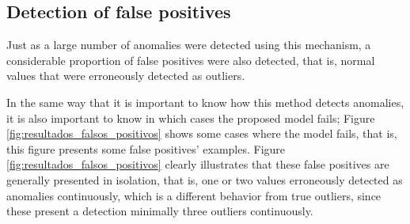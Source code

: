 \subsection{Detection of false positives}

Just as a large number of anomalies were detected using this mechanism, a considerable proportion of false positives were also detected, that is, normal values that were erroneously detected as outliers.

\vspace{5mm} %

In the same way that it is important to know how this method detects anomalies, it is also important to know in which cases the proposed model fails; Figure \ref{fig:resultados_falsos_positivos} shows some cases where the model fails, that is, this figure presents some false positives' examples. Figure \ref{fig:resultados_falsos_positivos} clearly illustrates that these false positives are generally presented in isolation, that is, one or two values erroneously detected as anomalies continuously, which is a different behavior from true outliers, since these present a detection minimally three outliers continuously.

